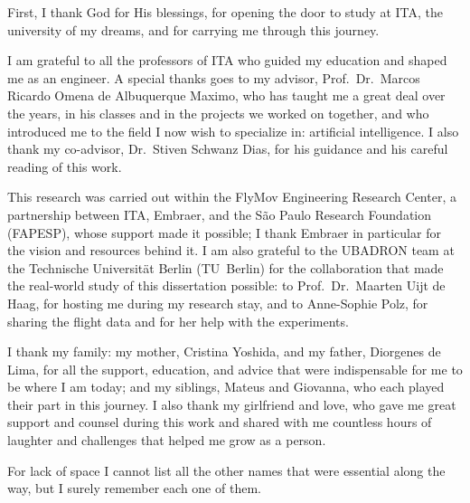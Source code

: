 
First, I thank God for His blessings, for opening the door to study at ITA, the
university of my dreams, and for carrying me through this journey.

I am grateful to all the professors of ITA who guided my education and shaped me
as an engineer. A special thanks goes to my advisor, Prof.\ Dr.\ Marcos Ricardo
Omena de Albuquerque Maximo, who has taught me a great deal over the years, in
his classes and in the projects we worked on together, and who introduced me to
the field I now wish to specialize in: artificial intelligence. I also thank my
co-advisor, Dr.\ Stiven Schwanz Dias, for his guidance and his careful
reading of this work.

This research was carried out within the FlyMov Engineering Research Center, a
partnership between ITA, Embraer, and the S\~ao Paulo Research Foundation
(FAPESP), whose support made it possible; I thank Embraer in particular for the
vision and resources behind it. I am also grateful to the UBADRON team at the
Technische Universit\"at Berlin (TU~Berlin) for the collaboration that made the
real-world study of this dissertation possible: to Prof.\ Dr.\ Maarten Uijt de
Haag, for hosting me during my research stay, and to Anne-Sophie Polz, for
sharing the flight data and for her help with the experiments.

I thank my family: my mother, Cristina Yoshida, and my father, Diorgenes de Lima,
for all the support, education, and advice that were indispensable for me to be
where I am today; and my siblings, Mateus and Giovanna, who each played their
part in this journey. I also thank my girlfriend and love, who gave me great
support and counsel during this work and shared with me countless hours of
laughter and challenges that helped me grow as a person.

For lack of space I cannot list all the other names that were essential along the
way, but I surely remember each one of them.
